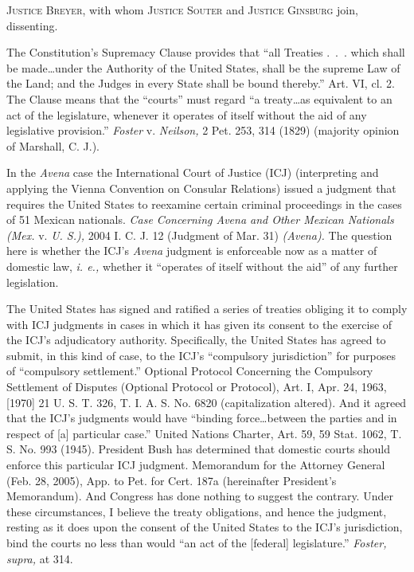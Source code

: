
\setcounter{page}{538}

  \textsc{Justice Breyer,} with whom \textsc{Justice Souter} and \textsc{Justice
Ginsburg} join, dissenting.

  The Constitution's Supremacy Clause provides that ``all Treaties
.~.~. which shall be made\dots under the Authority of the United
States, shall be the supreme Law of the Land; and the Judges in every
State shall be bound thereby.'' Art. VI, cl. 2. The Clause means
that the ``courts'' must regard ``a treaty\dots as equivalent to
an act of the legislature, whenever it operates of itself without the
aid of any legislative provision.'' \emph{Foster} v. \emph{Neilson,} 2 Pet.
253, 314 (1829) (majority opinion of Marshall, C. J.).

  In the \emph{Avena} case the International Court of Justice (ICJ)
(interpreting and applying the Vienna Convention on Consular Relations)
issued a judgment that requires the United States to reexamine certain
criminal proceedings in the cases of 51 Mexican nationals. \emph{Case
Concerning Avena and Other Mexican Nationals (Mex.} v. \emph{U. S.),} 2004
I. C. J. 12 (Judgment of Mar. 31) \emph{(Avena).} The question here is
whether the ICJ's \emph{Avena} judgment is enforceable now as a matter of
domestic law, \emph{i. e.,} whether it ``operates of itself without the
aid'' of any further legislation.

  The United States has signed and ratified a series of treaties
obliging it to comply with ICJ judgments in cases in which it has given
its consent to the exercise of the ICJ's adjudicatory authority.
Specifically, the United States has agreed to submit, in this kind
of case, to the ICJ's ``compulsory jurisdiction'' for purposes
of ``compulsory settlement.'' Optional Protocol Concerning the
Compulsory Settlement of Disputes (Optional Protocol or Protocol),
Art. I, Apr. 24, 1963, [1970] 21 U. S. T. 326, T. I. A. S. No. 6820
(capitalization altered). And it agreed that the ICJ's judgments
would have ``binding force\dots between the parties and in respect
of [a] particular case.'' United Nations Charter, Art. 59, 59
Stat. 1062, T. S. No. 993 (1945). President Bush has determined
that domestic courts should enforce this particular ICJ judgment.
Memorandum for the Attorney General \newpage  (Feb. 28, 2005), App.
to Pet. for Cert. 187a (hereinafter President's Memorandum).
And Congress has done nothing to suggest the contrary. Under these
circumstances, I believe the treaty obligations, and hence the judgment,
resting as it does upon the consent of the United States to the ICJ's
jurisdiction, bind the courts no less than would ``an act of the
[federal] legislature.'' \emph{Foster, supra,} at 314.

